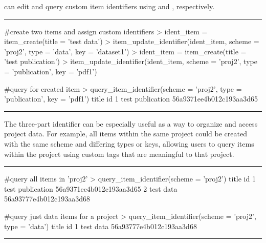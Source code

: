  can edit and query custom item identifiers using
 and ,
respectively.

\noindent\rule{\textwidth}{0.4pt}
\begin{example}
#create two items and assign custom identifiers
> ident_item = item_create(title = 'test data')
> item_update_identifier(ident_item, scheme = 'proj2', type = 'data', key = 'dataset1')
> ident_item = item_create(title = 'test publication')
> item_update_identifier(ident_item, scheme = 'proj2', type = 'publication', key = 'pdf1')

#query for created item
> query_item_identifier(scheme = 'proj2', type = 'publication', key = 'pdf1')
             title                       id
1 test publication 56a9371ee4b012c193aa3d65
\end{example}
\noindent\rule{\textwidth}{0.4pt}

The three-part identifier can be especially useful as a way to
organize and access project data. For example, all items within the same project
could be created with the same scheme and differing types or keys, allowing
users to query items within the project using custom tags that are meaningful to
that project.

\noindent\rule{\textwidth}{0.4pt}
\begin{example}
#query all items in 'proj2'
> query_item_identifier(scheme = 'proj2')
             title                       id
1 test publication 56a9371ee4b012c193aa3d65
2        test data 56a93777e4b012c193aa3d68

#query just data items for a project
> query_item_identifier(scheme = 'proj2', type = 'data')
      title                       id
1 test data 56a93777e4b012c193aa3d68
\end{example}
\noindent\rule{\textwidth}{0.4pt}
